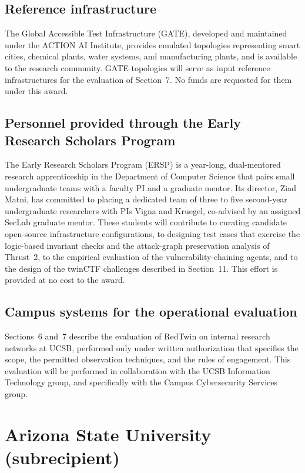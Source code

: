 \documentclass[11pt,letterpaper]{article}
\newcommand{\sysname}{RedTwin\xspace}
\begin{document}
\subsection{Reference infrastructure}
The Global Accessible Test Infrastructure (GATE), developed and maintained
under the ACTION AI Institute, provides emulated topologies representing smart
cities, chemical plants, water systems, and manufacturing plants, and is
available to the research community. GATE topologies will serve as input
reference infrastructures for the evaluation of Section~7. No funds are
requested for them under this award.

\subsection{Personnel provided through the Early Research Scholars Program}
The Early Research Scholars Program (ERSP) is a year-long, dual-mentored
research apprenticeship in the Department of Computer Science that pairs small
undergraduate teams with a faculty PI and a graduate mentor. Its director,
Ziad Matni, has committed to placing a dedicated team of three to five
second-year undergraduate researchers with PIs Vigna and Kruegel, co-advised
by an assigned SecLab graduate mentor. These students will contribute to
curating candidate open-source infrastructure configurations, to designing test
cases that exercise the logic-based invariant checks and the attack-graph
preservation analysis of Thrust~2, to the empirical evaluation of the
vulnerability-chaining agents, and to the design of the twinCTF challenges
described in Section~11. This effort is provided at no cost to the award.

\subsection{Campus systems for the operational evaluation}
Sections~6 and~7 describe the evaluation of \sysname on internal research
networks at UCSB, performed only under written authorization that specifies
the scope, the permitted observation techniques, and the rules of engagement.
This evaluation will be performed in collaboration with the UCSB Information Technology group, and specifically with the Campus Cybersecurity Services group.

\section{Arizona State University (subrecipient)}
\end{document}
